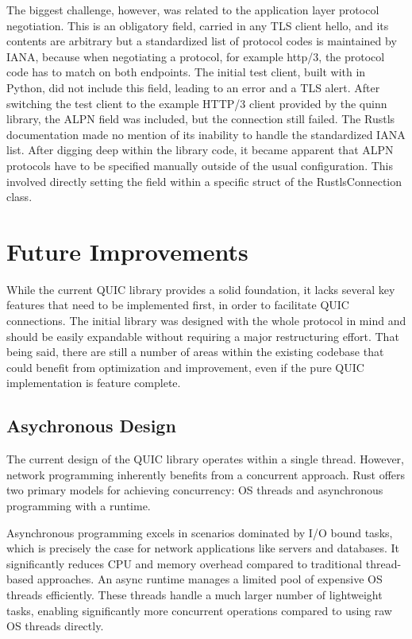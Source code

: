The biggest challenge, however, was related to the application layer protocol negotiation. This is an obligatory field, carried
in any TLS client hello, and its contents are arbitrary but a standardized list of protocol codes is maintained by IANA, because
when negotiating a protocol, for example http/3, the protocol code has to match on both endpoints. The initial test client, built
with  in Python, did not include this field, leading to an error and a TLS alert. After switching the test
client to the example HTTP/3 client provided by the quinn library, the ALPN field was included, but the connection still failed.
The Rustls documentation made no mention of its inability to handle the standardized IANA list. After digging deep
within the library code, it became apparent that ALPN protocols have to be specified manually outside of the usual configuration.
This involved directly setting the field within a specific struct of the RustlsConnection class. 

\section{Future Improvements}

While the current QUIC library provides a solid foundation, it lacks several key features that need to be implemented first, in
order to facilitate QUIC connections. The initial library was designed with the whole protocol in mind and should be
easily expandable without requiring a major restructuring effort. That being said, there are still a number of areas within the
existing codebase that could benefit from optimization and improvement, even if the pure QUIC implementation is feature complete.

\subsection{Asychronous Design}

The current design of the QUIC library operates within a single thread. However, network programming inherently benefits from a
concurrent approach. Rust offers two primary models for achieving concurrency: OS threads and asynchronous programming with a runtime.

Asynchronous programming excels in scenarios dominated by I/O bound tasks, which is precisely the case for network applications
like servers and databases. It significantly reduces CPU and memory overhead compared to traditional thread-based approaches.
An async runtime manages a limited pool of expensive OS threads efficiently. These threads handle a much larger
number of lightweight tasks, enabling significantly more concurrent operations compared to using raw OS threads directly.

